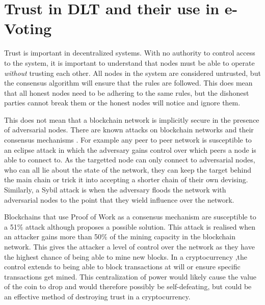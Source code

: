 \section{Trust in DLT and their use in e-Voting}
\label{ch:blockchain:trust}


Trust is important in decentralized systems. With no authority to control access to the system, it is important to understand that nodes must be able to operate \emph{without} trusting each other. All nodes in the system are considered untrusted, but the consensus algorithm will ensure that the rules are followed. This does mean that all honest nodes need to be adhering to the same rules, but the dishonest parties cannot break them or the honest nodes will notice and ignore them.

This does not mean that a blockchain network is implicitly secure in the presence of adversarial nodes. There are known attacks on blockchain networks and their consensus mechanisms \cite{wenAttacksCountermeasuresBlockchains2021a,eyalMajorityNotEnough2014,sapirshteinOptimalSelfishMining2017,karameDoublespendingFastPayments2012,apostolakiHijackingBitcoinRouting2017}. For example any peer to peer network is susceptible to an eclipse attack \cite{heilmanEclipseAttacksBitcoin2015} in which the adversary gains control over which peers a node is able to connect to. As the targetted node can only connect to adversarial nodes, who can all lie about the state of the network, they can keep the target behind the main chain or trick it into accepting a shorter chain of their own devising. Similarly, a Sybil attack \cite{douceurSybilAttack2002} is when the adversary floods the network with adversarial nodes to the point that they wield influence over the network.

Blockchains that use Proof of Work as a consensus mechanism are susceptible to a 51\% attack although \cite{yangEffectiveScheme512019} proposes a possible solution. This attack is realised when an attacker gains more than 50\% of the mining capacity in the blockchain network. This gives the attacker a level of control over the network as they have the highest chance of being able to mine new blocks. In a cryptocurrency ,the control extends to being able to block transactions at will or ensure specific transactions get mined. This centralization of power would likely cause the value of the coin to drop and would therefore possibly be self-defeating, but could be an effective method of destroying trust in a cryptocurrency.

